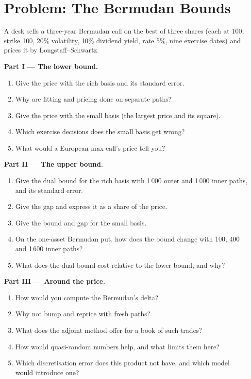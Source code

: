 \section{Problem: The Bermudan Bounds}

\begin{problem}\label{pb:dv:monte-carlo-pricers-in-practice:1}
A desk sells a three-year Bermudan call on the best of three shares (each at 100, strike 100, 20\% volatility, 10\% dividend yield, rate 5\%, nine exercise dates)
and prices it by Longstaff--Schwartz.

\medskip\noindent\textbf{Part I --- The lower bound.}
\begin{enumerate}
\item Give the price with the rich basis and its standard error.
\item Why are fitting and pricing done on separate paths?
\item Give the price with the small basis (the largest price and its square).
\item Which exercise decisions does the small basis get wrong?
\item What would a European max-call's price tell you?
\end{enumerate}

\medskip\noindent\textbf{Part II --- The upper bound.}
\begin{enumerate}[resume]
\item Give the dual bound for the rich basis with 1\,000 outer and 1\,000 inner paths, and its standard error.
\item Give the gap and express it as a share of the price.
\item Give the bound and gap for the small basis.
\item On the one-asset Bermudan put, how does the bound change with 100, 400 and 1\,600 inner paths?
\item What does the dual bound cost relative to the lower bound, and why?
\end{enumerate}

\medskip\noindent\textbf{Part III --- Around the price.}
\begin{enumerate}[resume]
\item How would you compute the Bermudan's delta?
\item Why not bump and reprice with fresh paths?
\item What does the adjoint method offer for a book of such trades?
\item How would quasi-random numbers help, and what limits them here?
\item Which discretisation error does this product not have, and which model would introduce one?
\end{enumerate}


\end{problem}
